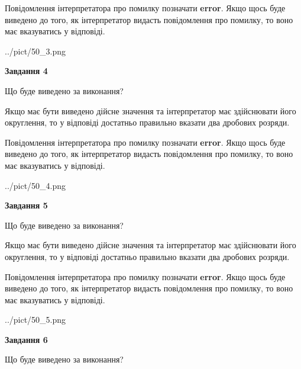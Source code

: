 \documentclass[12pt, ukrainian]{article}
\begin{document}
{\begin {Large}
Повідомлення інтерпретатора про помилку позначати \textbf{error}.
Якщо щось буде виведено до того, як інтерпретатор видасть повідомлення про помилку, 
то воно має вказуватись у відповіді. \par

\begin{center}
	{../pict/50_3.png}
\end{center}
\newpage

{\begin {center}\textbf{Завдання 4}\end {center}}\par
Що буде виведено за виконання? \par

Якщо має бути виведено дійсне значення та інтерпретатор має здійснювати його округлення, 
то у відповіді достатньо правильно вказати два дробових розряди.

Повідомлення інтерпретатора про помилку позначати \textbf{error}.
Якщо щось буде виведено до того, як інтерпретатор видасть повідомлення про помилку, 
то воно має вказуватись у відповіді. \par

\begin{center}
	{../pict/50_4.png}
\end{center}
\newpage

{\begin {center}\textbf{Завдання 5}\end {center}}\par
Що буде виведено за виконання? \par

Якщо має бути виведено дійсне значення та інтерпретатор має здійснювати його округлення, 
то у відповіді достатньо правильно вказати два дробових розряди.

Повідомлення інтерпретатора про помилку позначати \textbf{error}.
Якщо щось буде виведено до того, як інтерпретатор видасть повідомлення про помилку, 
то воно має вказуватись у відповіді. \par

\begin{center}
	{../pict/50_5.png}
\end{center}
\newpage

{\begin {center}\textbf{Завдання 6}\end {center}}\par
Що буде виведено за виконання? \par


\end{Large}}
\end{document}
